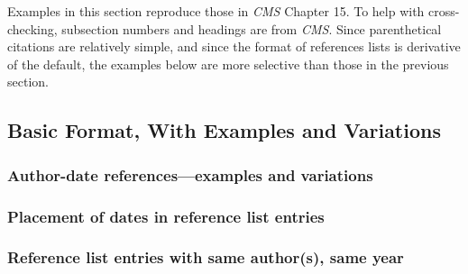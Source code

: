 \documentclass[11pt,letterpaper,oneside]{article}
\begin{document}
Examples in this section reproduce those in \textit{CMS} Chapter 15.
To help with cross-checking, subsection numbers and headings are from
\textit{CMS}. Since parenthetical citations are relatively simple, and
since the format of references lists is derivative of the default, the
examples below are more selective than those in the previous section.

\subsection{Basic Format, With Examples and Variations}
\setcounter{subsection}{15}

\setcounter{subsubsection}{8}
\subsubsection{Author-date references—examples and variations}

\begin{citeref}
\item \parencite[87-88]{strayed2012}
\item \parencite[261, 265]{strayed2012}
\item \parencite[32]{daum2015}
\item \parencite[188]{grazer2015}
\item \parencite[242--55]{garcia1988}
\item \parencite[310]{gould1984a}
\item \parencite[484--85]{bagley2015}
\item \parencite[312]{liu2015}
\end{citeref}

\setcounter{subsubsection}{13}
\subsubsection{Placement of dates in reference list entries}

\begin{citeref}
\item \parencite{pager2015}
\item \parencite{unger2014}
\end{citeref}

\setcounter{subsubsection}{19}
\subsubsection{Reference list entries with same author(s), same year}
\end{document}
